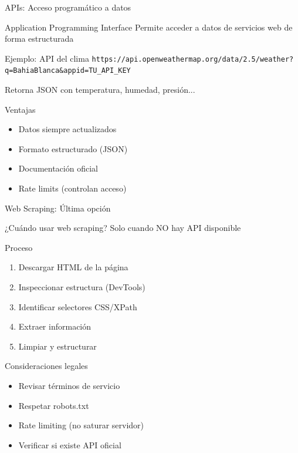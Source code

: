 \documentclass[aspectratio=169]{beamer}
\begin{document}
\begin{frame}{APIs: Acceso programático a datos}
\begin{block}{Application Programming Interface}
Permite acceder a datos de servicios web de forma estructurada
\end{block}

\begin{exampleblock}{Ejemplo: API del clima}
\texttt{https://api.openweathermap.org/data/2.5/weather?}\\
\texttt{q=BahiaBlanca\&appid=TU\_API\_KEY}

Retorna JSON con temperatura, humedad, presión...
\end{exampleblock}

\pause

\begin{block}{Ventajas}
\begin{itemize}
    \item Datos siempre actualizados
    \item Formato estructurado (JSON)
    \item Documentación oficial
    \item Rate limits (controlan acceso)
\end{itemize}
\end{block}
\end{frame}

\begin{frame}{Web Scraping: Última opción}
\begin{alertblock}{¿Cuándo usar web scraping?}
Solo cuando NO hay API disponible
\end{alertblock}

\begin{block}{Proceso}
\begin{enumerate}
    \item Descargar HTML de la página
    \item Inspeccionar estructura (DevTools)
    \item Identificar selectores CSS/XPath
    \item Extraer información
    \item Limpiar y estructurar
\end{enumerate}
\end{block}

\pause

\begin{alertblock}{Consideraciones legales}
\begin{itemize}
    \item Revisar términos de servicio
    \item Respetar robots.txt
    \item Rate limiting (no saturar servidor)
    \item Verificar si existe API oficial
\end{itemize}
\end{alertblock}
\end{frame}
\end{document}
